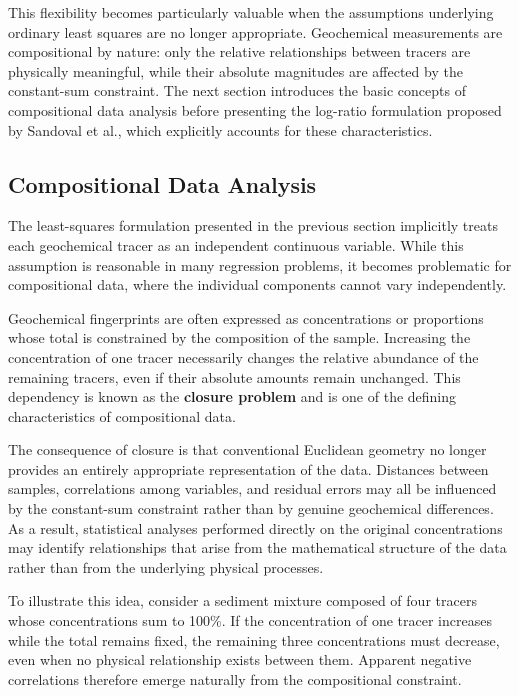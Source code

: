 \documentclass[
  12pt,
  letterpaper,
]{book}
\begin{document}
This flexibility becomes particularly valuable when the assumptions
underlying ordinary least squares are no longer appropriate. Geochemical
measurements are compositional by nature: only the relative
relationships between tracers are physically meaningful, while their
absolute magnitudes are affected by the constant-sum constraint. The
next section introduces the basic concepts of compositional data
analysis before presenting the log-ratio formulation proposed by
Sandoval et al., which explicitly accounts for these characteristics.

\subsection{Compositional Data
Analysis}\label{compositional-data-analysis}

The least-squares formulation presented in the previous section
implicitly treats each geochemical tracer as an independent continuous
variable. While this assumption is reasonable in many regression
problems, it becomes problematic for compositional data, where the
individual components cannot vary independently.

Geochemical fingerprints are often expressed as concentrations or
proportions whose total is constrained by the composition of the sample.
Increasing the concentration of one tracer necessarily changes the
relative abundance of the remaining tracers, even if their absolute
amounts remain unchanged. This dependency is known as the
\textbf{closure problem} and is one of the defining characteristics of
compositional data.

The consequence of closure is that conventional Euclidean geometry no
longer provides an entirely appropriate representation of the data.
Distances between samples, correlations among variables, and residual
errors may all be influenced by the constant-sum constraint rather than
by genuine geochemical differences. As a result, statistical analyses
performed directly on the original concentrations may identify
relationships that arise from the mathematical structure of the data
rather than from the underlying physical processes.

To illustrate this idea, consider a sediment mixture composed of four
tracers whose concentrations sum to 100\%. If the concentration of one
tracer increases while the total remains fixed, the remaining three
concentrations must decrease, even when no physical relationship exists
between them. Apparent negative correlations therefore emerge naturally
from the compositional constraint.
\end{document}
